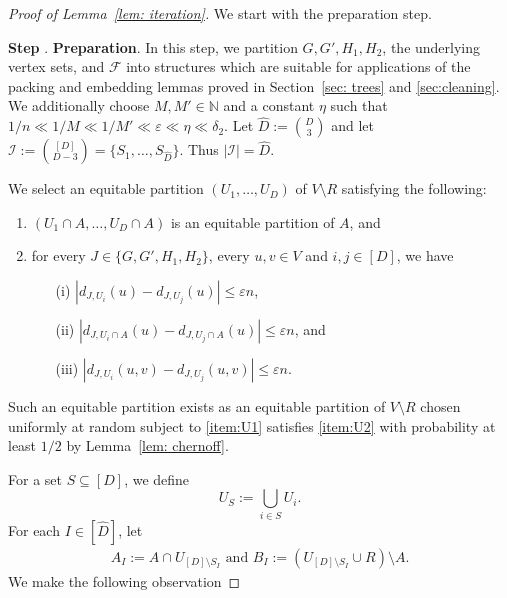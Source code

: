 \documentclass[a4paper, 11pt, reqno]{amsart}
\numberwithin{equation}{section}
\newcommand{\1}{{\rm 1\hspace*{-0.4ex}%
\rule{0.1ex}{1.52ex}\hspace*{0.2ex}}}
\newcommand{\N}{\mathbb N}
\newcommand{\cF}{\mathcal{F}}
\newcommand{\cI}{\mathcal{I}}
\newcommand{\I}{I}
\renewcommand{\epsilon}{\varepsilon}
\newcommand{\sm}{\setminus}
\newcommand{\COMMENT}[1]{}
\newcounter{step}
\newcommand{\step}[1]{\bigskip\refstepcounter{step}\textbf{Step \thestep}. \textbf{#1}.}
\begin{document}
\begin{proof}[Proof of Lemma~\ref{lem: iteration}]
We start with the preparation step.

\step{Preparation}\label{step1}
In this step, we partition $G,G',H_1,H_2$, 
the underlying vertex sets, 
and $\cF$ into structures which are suitable for applications of the packing and embedding lemmas proved in Section~\ref{sec: trees} and \ref{sec:cleaning}.
We additionally choose $M,M'\in \N$ and a constant $\eta$ such that $1/n\ll 1/M \ll 1/M' \ll \epsilon\ll \eta \ll \delta_2$. Let $\hat{D}:=\binom{D}{3}$ and
let $\cI:= \binom{[D]}{D-3} =\{ S_1,\dots, S_{\hat{D}}\}$. Thus $|\cI|=\hat{D}$.


We select an equitable partition $(U_1,\dots, U_D)$ of $V\sm R$ satisfying the following:
\begin{enumerate}[label=(U\arabic*)]
\item\label{item:U1} $(U_1\cap A,\ldots,U_D\cap A)$ is an equitable partition of $A$, and
\item\label{item:U2} for every $J\in \{G,G',H_1,H_2\}$, every $u,v\in V$ and $i,j\in [D]$, we have 
\begin{itemize}
\item[(i)] $|d_{J,U_i}(u)- d_{J,U_j}(u)|\leq \epsilon n$, 
\item[(ii)] $|d_{J,U_i\cap A}(u)- d_{J,U_j\cap A}(u)|\leq \epsilon n$, and
\item[(iii)] $|d_{J,U_i}(u,v)- d_{J,U_j}(u,v)|\leq \epsilon n$.
\end{itemize}
\end{enumerate}
Such an equitable partition exists as an equitable partition of $V\setminus R$
chosen uniformly at random subject to \ref{item:U1} satisfies \ref{item:U2} with probability at least $1/2$ by Lemma~\ref{lem: chernoff}.%
\COMMENT{We take $U_1,\dots, U_D$ satisfying (U1) uniformly at random.
For any set $S$ of size at least $\epsilon n$, $$\mathbb{E}[|U_i\cap S|] = D^{-1}|S|,$$ and $\mathbb{P}[|U_i\cap S| = D^{-1}|S|\pm \epsilon n/2] \geq 1-(1-c)^n$. We take union bound for $S= N_{H'}(v)$ or $S=N_{H'}(u,v)$ or $N_{H'}(v)\cap A, N_{H'}(u,v)\cap A$ then we get this with probability at least $1- 16 D n^2(1-c)^n$.} 
For a set $S\subseteq [D]$, we define 
$$U_{S}:=\bigcup_{i\in S} U_i.$$
For each $\I\in [\hat{D}]$, let 
\begin{align}\label{eq:defAB}
	A_\I:= A\cap U_{[D]\setminus S_\I}\text{ and }B_\I:= (U_{[D]\setminus S_\I}\cup  R)\setminus A.
\end{align}
We make the following observation

\end{proof}
\end{document}
